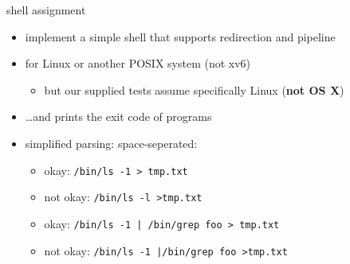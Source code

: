 \begin{frame}[fragile,label=shellAssign]{shell assignment}
    \begin{itemize}
    \item implement a simple shell that supports redirection and pipeline
    \item for Linux or another POSIX system (not xv6)
        \begin{itemize}
        \item but our supplied tests assume specifically Linux (\textbf{not OS X})
        \end{itemize}
    \item \ldots and prints the exit code of programs
    \vspace{.5cm}
    \item simplified parsing: space-seperated:
        \begin{itemize}
        \item okay: \verb*|/bin/ls -1 > tmp.txt|
        \item not okay: \verb*|/bin/ls -l >tmp.txt|
        \item okay: \verb*!/bin/ls -1 | /bin/grep foo > tmp.txt!
        \item not okay: \verb*!/bin/ls -1 |/bin/grep foo >tmp.txt!
        \end{itemize}
    \end{itemize}
\end{frame}
